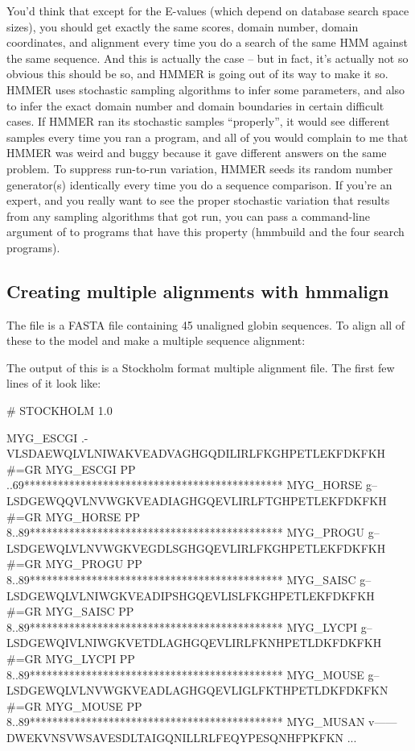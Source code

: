 You'd think that except for the E-values (which depend on database
search space sizes), you should get exactly the same scores, domain
number, domain coordinates, and alignment every time you do a search
of the same HMM against the same sequence. And this is actually the
case -- but in fact, it's actually not so obvious this should be so,
and HMMER is going out of its way to make it so. HMMER uses stochastic
sampling algorithms to infer some parameters, and also to infer the
exact domain number and domain boundaries in certain difficult
cases. If HMMER ran its stochastic samples ``properly'', it would see
different samples every time you ran a program, and all of you would
complain to me that HMMER was weird and buggy because it gave
different answers on the same problem. To suppress run-to-run
variation, HMMER seeds its random number generator(s) identically
every time you do a sequence comparison. If you're an expert, and you
really want to see the proper stochastic variation that results from
any sampling algorithms that got run, you can pass a command-line
argument of  to programs that have this property
(hmmbuild and the four search programs).








\subsection{Creating multiple alignments with hmmalign}

The file  is a FASTA file containing 45
unaligned globin sequences. To align all of these to the
 model and make a multiple sequence alignment:


The output of this is a Stockholm format multiple alignment file. The
first few lines of it look like:

\begin{samepage}
\begin{sreoutput}
# STOCKHOLM 1.0

MYG_ESCGI          .-VLSDAEWQLVLNIWAKVEADVAGHGQDILIRLFKGHPETLEKFDKFKH
#=GR MYG_ESCGI  PP ..69**********************************************
MYG_HORSE          g--LSDGEWQQVLNVWGKVEADIAGHGQEVLIRLFTGHPETLEKFDKFKH
#=GR MYG_HORSE  PP 8..89*********************************************
MYG_PROGU          g--LSDGEWQLVLNVWGKVEGDLSGHGQEVLIRLFKGHPETLEKFDKFKH
#=GR MYG_PROGU  PP 8..89*********************************************
MYG_SAISC          g--LSDGEWQLVLNIWGKVEADIPSHGQEVLISLFKGHPETLEKFDKFKH
#=GR MYG_SAISC  PP 8..89*********************************************
MYG_LYCPI          g--LSDGEWQIVLNIWGKVETDLAGHGQEVLIRLFKNHPETLDKFDKFKH
#=GR MYG_LYCPI  PP 8..89*********************************************
MYG_MOUSE          g--LSDGEWQLVLNVWGKVEADLAGHGQEVLIGLFKTHPETLDKFDKFKN
#=GR MYG_MOUSE  PP 8..89*********************************************
MYG_MUSAN          v------DWEKVNSVWSAVESDLTAIGQNILLRLFEQYPESQNHFPKFKN
...
\end{sreoutput}
\end{samepage}

